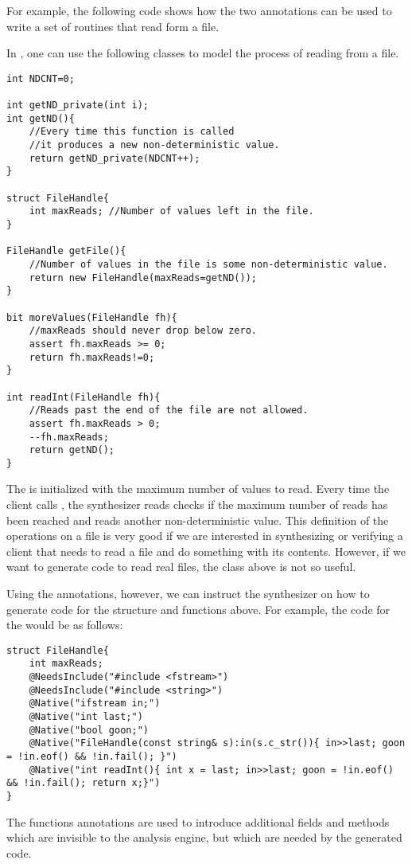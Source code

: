 For example, the following code shows how the two  annotations can be used to write a set of routines that read form a file.

\begin{Example}
In \Sk{}, one can use the following classes to model the process of reading from a file.

\begin{lstlisting}
int NDCNT=0;

int getND_private(int i);
int getND(){
    //Every time this function is called
    //it produces a new non-deterministic value.
    return getND_private(NDCNT++);
}

struct FileHandle{
    int maxReads; //Number of values left in the file.
}

FileHandle getFile(){
    //Number of values in the file is some non-deterministic value.
    return new FileHandle(maxReads=getND());
}

bit moreValues(FileHandle fh){
    //maxReads should never drop below zero.
    assert fh.maxReads >= 0;
    return fh.maxReads!=0;
}

int readInt(FileHandle fh){
    //Reads past the end of the file are not allowed.
    assert fh.maxReads > 0;
    --fh.maxReads;
    return getND();
}
\end{lstlisting}

The  is initialized with the maximum number of values to read. Every time the client calls , the synthesizer reads checks if the maximum number of reads has been reached and reads another non-deterministic value. This definition of the operations on a file is very good if we are interested in synthesizing or verifying a client that needs to read a file and do something with its contents. However, if we want to generate code to read real files, the class above is not so useful.

Using the  annotations, however, we can instruct the synthesizer on how to generate code for the structure and functions above. For example, the code for the  would be as follows:

\begin{lstlisting}
struct FileHandle{
    int maxReads;
    @NeedsInclude("#include <fstream>")
    @NeedsInclude("#include <string>")
    @Native("ifstream in;")
    @Native("int last;")
    @Native("bool goon;")
    @Native("FileHandle(const string& s):in(s.c_str()){ in>>last; goon = !in.eof() && !in.fail(); }")
    @Native("int readInt(){ int x = last; in>>last; goon = !in.eof() && !in.fail(); return x;}")
}
\end{lstlisting}
The functions annotations are used to introduce additional fields and methods which are invisible to the analysis engine, but which are needed by the generated code.


\end{Example}
